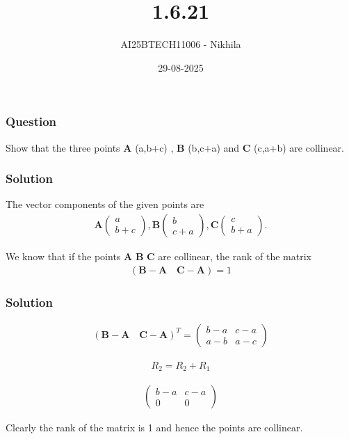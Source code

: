 \documentclass{beamer}
\title{1.6.21}
\author{AI25BTECH11006 - Nikhila}
\date{29-08-2025}
\begin{document}
\frame{\titlepage}

\begin{frame}
\frametitle{Question}
Show that the three points \textbf{A} (a,b+c) , \textbf{B} (b,c+a) and \textbf{C} (c,a+b) are collinear.
\\\end{frame}




\begin{frame}
\frametitle{Solution}
 The vector components of the given points are \\ 
 
 \hspace*{3cm} 
 \begin{align*}   
 \textbf{A}\begin{pmatrix}a \\ b + c \end{pmatrix}, \textbf{B}\begin{pmatrix}b \\ c + a \end{pmatrix}, \textbf{C}\begin{pmatrix}c \\ b + a \end{pmatrix}.
 \end{align*}

 \vspace{2em}

 We know that if the points \textbf{A} \textbf{B} \textbf{C} are collinear, the rank of the matrix 
  \begin{align}
(\textbf{B} - \textbf{A} \quad \textbf{C} - \textbf{A}) = 1
\end{align}   
\end{frame}

\begin{frame}
\frametitle{Solution}
\begin{align}
    {(\textbf{B} - \textbf{A} \quad \textbf{C} - \textbf{A})}^T =  
    \begin{pmatrix}
      b - a & c - a\\
      a - b & a - c
     \end{pmatrix}
\end{align}

\begin{align}
    R_2 = R_2 + R_1
\end{align}


\begin{align}
 \begin{pmatrix}    
 b - a & c - a\\
0 & 0
\end{pmatrix}
\end{align}

Clearly the rank of the matrix is 1 and hence the points are collinear.


 \end{frame}
\end{document}
